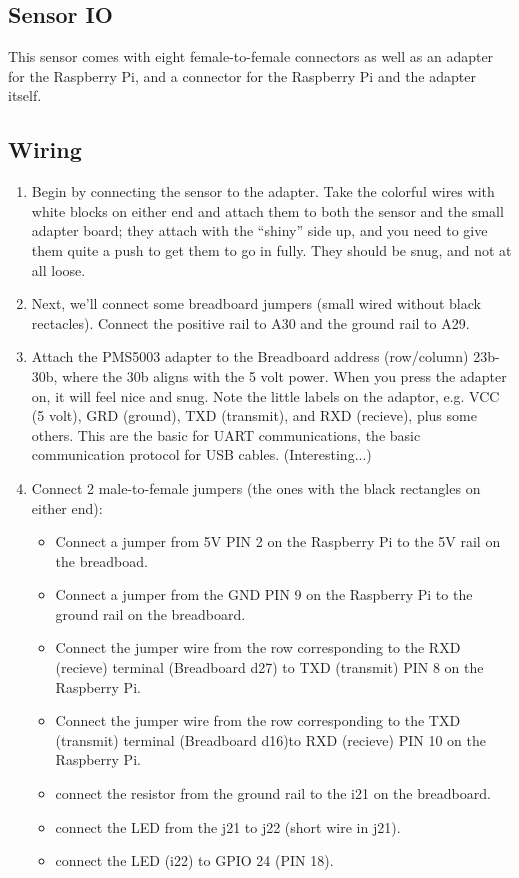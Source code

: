\documentclass{article}
\begin{document}
\subsection{Sensor IO}

This sensor comes with eight female-to-female connectors as well as an adapter for the Raspberry Pi, and a connector for the Raspberry Pi and the adapter itself.  

\subsection{Wiring}

\begin{enumerate}
  \item Begin by connecting the sensor to the adapter. Take the colorful wires with white blocks on either end and attach them to both the sensor and the small adapter board; they attach with the ``shiny'' side up, and you need to give them quite a push to get them to go in fully. They should be snug, and not at all loose.

  \item Next, we'll connect some breadboard jumpers (small wired without black rectacles). Connect the positive rail to A30 and the ground rail to A29. 
  
  \item Attach the PMS5003 adapter to the Breadboard address (row/column) 23b-30b, where the 30b aligns with the 5 volt power. When you press the adapter on, it will feel nice and snug. Note the little labels on the adaptor, e.g. VCC (5 volt), GRD (ground), TXD (transmit), and RXD (recieve), plus some others. This are the basic for UART communications, the basic communication protocol for USB cables. (Interesting...)
  
  \item Connect 2 male-to-female jumpers (the ones with the black rectangles on either end):
 

\begin{itemize}
  \item Connect a jumper from 5V PIN 2 on the Raspberry Pi to the 5V rail on the breadboad.

  \item Connect a jumper from the GND PIN 9 on the Raspberry Pi to the ground rail on the breadboard. 

  \item Connect the jumper wire from the row corresponding to the RXD (recieve) terminal (Breadboard d27) to TXD (transmit) PIN 8 on the Raspberry Pi. 
  \item Connect the jumper wire from the row corresponding to the TXD (transmit) terminal (Breadboard d16)to RXD (recieve) PIN 10 on the Raspberry Pi.
  \item connect the resistor from the ground rail to the i21 on the breadboard. 
  \item connect the LED from the j21 to j22 (short wire in j21).
  \item connect the LED (i22) to GPIO 24 (PIN 18).
\end{itemize}


\end{enumerate}
\end{document}
